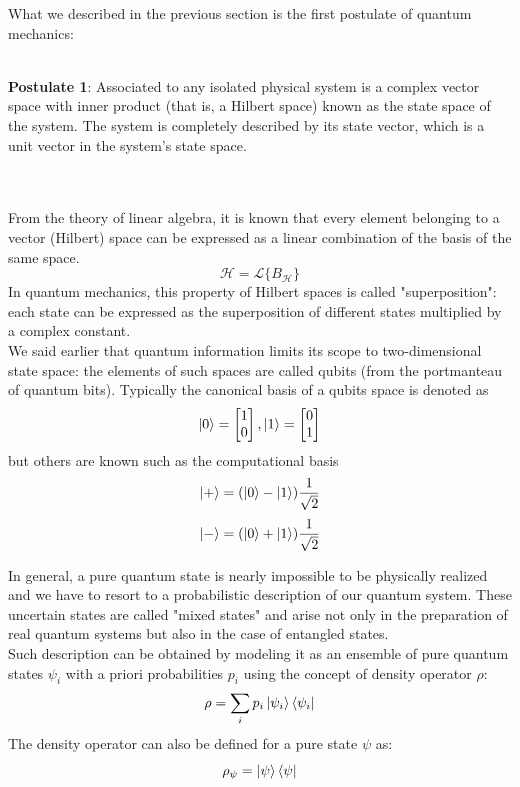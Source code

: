 \documentclass[journal, letterpaper]{IEEEtran}
\begin{document}
What we described in the previous section is the first postulate of quantum mechanics: \\ \\
\begin{minipage}{\linewidth}
    \textbf{Postulate 1}: Associated to any isolated physical system is a complex vector space with inner product (that is, a Hilbert space) known as the state space of the system. The system is completely described by its state vector, which is a unit vector in the system’s state space. \cite{chuang}
\end{minipage}\\ \\

From the theory of linear algebra, it is known that every element belonging to a vector (Hilbert) space can be expressed as a linear combination of the basis of the same space.
\[\mathscr{H} = \mathscr{L} \{B_{\mathscr{H}}\}\]
In quantum mechanics, this property of Hilbert spaces is called "superposition": each state can be expressed as the superposition of different states multiplied by a complex constant.\\
We said earlier that quantum information limits its scope to two-dimensional state space: the elements of such spaces are called qubits (from the portmanteau of quantum bits). Typically the canonical basis of a qubits space is denoted as \[\ket{0} = \begin{bmatrix}
           1 \\
           0 \\
           \end{bmatrix},
\ket{1} =  \begin{bmatrix}
           0 \\
           1 \\
           \end{bmatrix}\] 
but others are known such as the computational basis \[\ket{+} = (\ket{0} - \ket{1})\frac{1}{\sqrt{2}} \]
\[\ket{-} = (\ket{0} + \ket{1})\frac{1}{\sqrt{2}} \]

In general, a pure quantum state is nearly impossible to be physically realized and we have to resort to a probabilistic description of our quantum system. These uncertain states are called "mixed states" and arise not only in the preparation of real quantum systems but also in the case of entangled states.\\ 
Such description can be obtained by modeling it as an ensemble of pure quantum states $\psi_{i}$ with a priori probabilities $p_i$ using the concept of density operator $\rho$: 
 \[\rho = \sum_{i}p_i\ket{\psi_i}\bra{\psi_{i}}\]
The density operator can also be defined for a pure state $\psi$ as: 
\[\rho_\psi = \ket{\psi}\bra{\psi}\]
 
\end{document}
